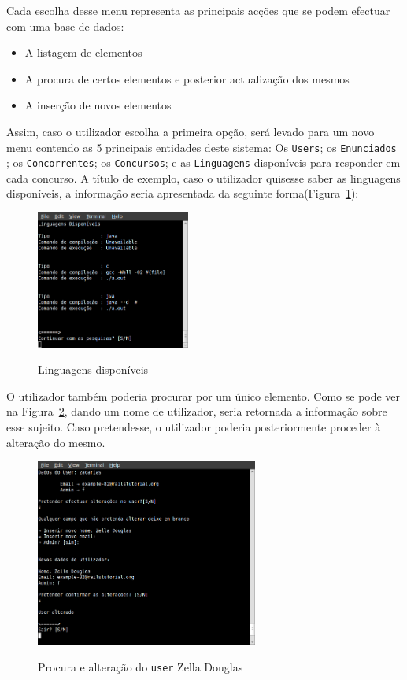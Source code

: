 Cada escolha desse menu representa as principais acções que se podem efectuar com uma base de dados: 

\begin{itemize}
 \item A listagem de elementos
 \item A procura de certos elementos e posterior actualização dos mesmos
 \item A inserção de novos elementos
\end{itemize}

Assim, caso o utilizador escolha a primeira opção, será levado para um novo menu contendo as 5 principais entidades deste sistema: Os \texttt{Users}; os \texttt{Enunciados}
; os \texttt{Concorrentes}; os \texttt{Concursos}; e as \texttt{Linguagens} disponíveis para responder em cada concurso. A título de exemplo, caso o utilizador quisesse saber 
as linguagens disponíveis, a informação seria apresentada da seguinte forma(Figura~\ref{img linguagens}):\\

\begin{figure}[H]
\begin{center}
\includegraphics[width=0.45\textwidth]{Images/linguagens}\label{img linguagens}
\caption{Linguagens disponíveis}
\end{center}
\end{figure} 

O utilizador também poderia procurar por um único elemento. Como se pode ver na Figura~\ref{img zelladouglas}, dando um nome de utilizador, 
seria retornada a informação sobre esse sujeito. Caso pretendesse, o utilizador poderia posteriormente proceder à alteração do mesmo.\\

\begin{figure}[H]
\begin{center}
\includegraphics[width=0.65\textwidth]{Images/zacarias}\label{img zelladouglas}
\caption{Procura e alteração do \texttt{user} Zella Douglas}
\end{center}
\end{figure} 
